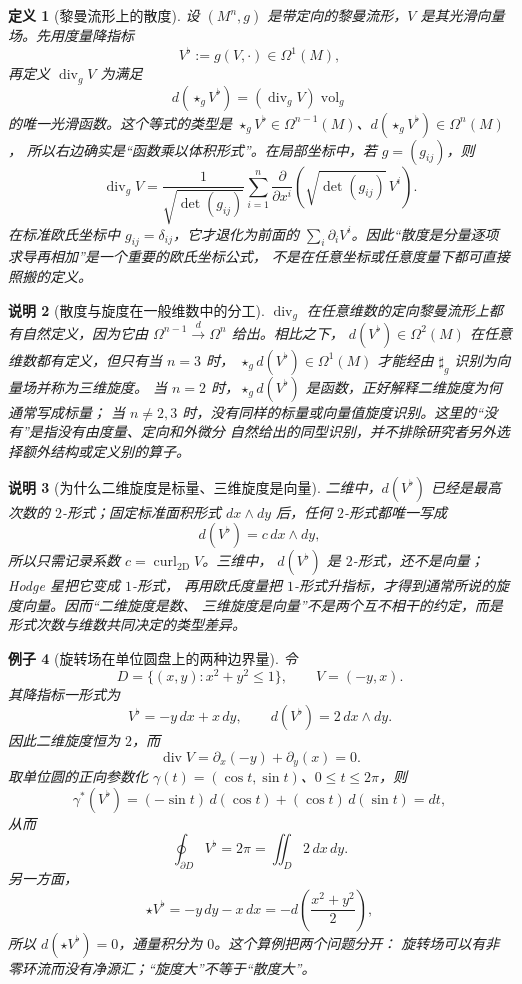 \documentclass[UTF8,fontset=none,a4paper,11pt]{ctexart}
\theoremstyle{foundation-definition}
\newtheorem{definition}{定义}[section]
\theoremstyle{foundation-theorem}
\theoremstyle{foundation-proposition}
\theoremstyle{foundation-example}
\newtheorem{example}[definition]{例子}
\theoremstyle{foundation-remark}
\newtheorem{remark}[definition]{说明}
\theoremstyle{foundation-theorem}
\begin{document}
\begin{definition}[黎曼流形上的散度]\label{def:riemannian-divergence}
设 \((M^n,g)\) 是带定向的黎曼流形，\(V\) 是其光滑向量场。先用度量降指标
\[
V^\flat:=g(V,\mathord\cdot)\in\Omega^1(M),
\]
再定义 \(\operatorname{div}_gV\) 为满足
\[
d(\star_gV^\flat)=(\operatorname{div}_gV)\operatorname{vol}_g
\]
的唯一光滑函数。这个等式的类型是
\(\star_gV^\flat\in\Omega^{n-1}(M)\)、\(d(\star_gV^\flat)\in\Omega^n(M)\)，
所以右边确实是“函数乘以体积形式”。在局部坐标中，若 \(g=(g_{ij})\)，则
\[
\operatorname{div}_gV
=\frac{1}{\sqrt{\det(g_{ij})}}
\sum_{i=1}^n\frac{\partial}{\partial x^i}
\left(\sqrt{\det(g_{ij})}\,V^i\right).
\]
在标准欧氏坐标中 \(g_{ij}=\delta_{ij}\)，它才退化为前面的
\(\sum_i\partial_iV^i\)。因此“散度是分量逐项求导再相加”是一个重要的欧氏坐标公式，
不是在任意坐标或任意度量下都可直接照搬的定义。
\end{definition}

\begin{remark}[散度与旋度在一般维数中的分工]
\(\operatorname{div}_g\) 在任意维数的定向黎曼流形上都有自然定义，因为它由
\(\Omega^{n-1}\xrightarrow{d}\Omega^n\) 给出。相比之下，
\(d(V^\flat)\in\Omega^2(M)\) 在任意维数都有定义，但只有当 \(n=3\) 时，
\(\star_gd(V^\flat)\in\Omega^1(M)\) 才能经由 \(\sharp_g\) 识别为向量场并称为三维旋度。
当 \(n=2\) 时，\(\star_gd(V^\flat)\) 是函数，正好解释二维旋度为何通常写成标量；
当 \(n\neq2,3\) 时，没有同样的标量或向量值旋度识别。这里的“没有”是指没有由度量、定向和外微分
自然给出的同型识别，并不排除研究者另外选择额外结构或定义别的算子。
\end{remark}

\begin{remark}[为什么二维旋度是标量、三维旋度是向量]
二维中，\(d(V^\flat)\) 已经是最高次数的 \(2\)-形式；固定标准面积形式
\(dx\wedge dy\) 后，任何 \(2\)-形式都唯一写成
\[
d(V^\flat)=c\,dx\wedge dy,
\]
所以只需记录系数 \(c=\operatorname{curl}_{2\mathrm D}V\)。三维中，
\(d(V^\flat)\) 是 \(2\)-形式，还不是向量；Hodge 星把它变成 \(1\)-形式，
再用欧氏度量把 \(1\)-形式升指标，才得到通常所说的旋度向量。因而“二维旋度是数、
三维旋度是向量”不是两个互不相干的约定，而是形式次数与维数共同决定的类型差异。
\end{remark}

\begin{example}[旋转场在单位圆盘上的两种边界量]
令
\[
D=\{(x,y):x^2+y^2\leq1\},\qquad V=(-y,x).
\]
其降指标一形式为
\[
V^\flat=-y\,dx+x\,dy,\qquad
d(V^\flat)=2\,dx\wedge dy.
\]
因此二维旋度恒为 \(2\)，而
\[
\operatorname{div}V=\partial_x(-y)+\partial_y(x)=0.
\]
取单位圆的正向参数化
\(\gamma(t)=(\cos t,\sin t)\)、\(0\leq t\leq2\pi\)，则
\[
\gamma^*(V^\flat)
=(-\sin t)\,d(\cos t)+(\cos t)\,d(\sin t)
=dt,
\]
从而
\[
\oint_{\partial D}V^\flat=2\pi
=\iint_D2\,dx\,dy.
\]
另一方面，
\[
\star V^\flat=-y\,dy-x\,dx
= -d\!\left(\frac{x^2+y^2}{2}\right),
\]
所以 \(d(\star V^\flat)=0\)，通量积分为 \(0\)。这个算例把两个问题分开：
旋转场可以有非零环流而没有净源汇；“旋度大”不等于“散度大”。
\end{example}
\end{document}
